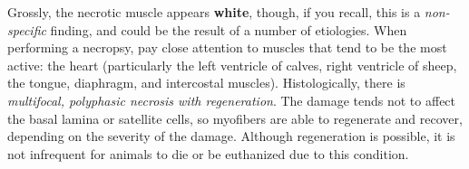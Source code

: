 \documentclass[openany]{book}
\begin{document}
Grossly, the necrotic muscle appears \textbf{white}, though, if you
recall, this is a \emph{non-specific} finding, and could be the result
of a number of etiologies. When performing a necropsy, pay close
attention to muscles that tend to be the most active: the heart
(particularly the left ventricle of calves, right ventricle of sheep,
the tongue, diaphragm, and intercostal muscles). Histologically, there
is \emph{multifocal, polyphasic necrosis with regeneration}. The damage
tends not to affect the basal lamina or satellite cells, so myofibers
are able to regenerate and recover, depending on the severity of the
damage. Although regeneration is possible, it is not infrequent for
animals to die or be euthanized due to this condition.


\end{document}
